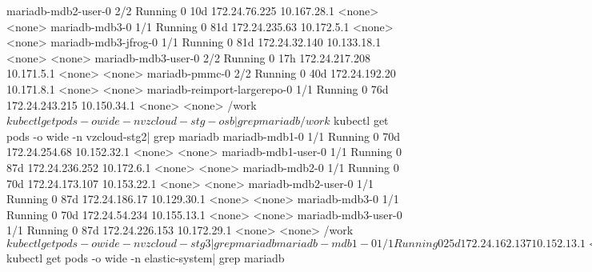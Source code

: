mariadb-mdb2-user-0                                   2/2     Running       0          10d     172.24.76.225    10.167.28.1   <none>           <none>
mariadb-mdb3-0                                        1/1     Running       0          81d     172.24.235.63    10.172.5.1    <none>           <none>
mariadb-mdb3-jfrog-0                                  1/1     Running       0          81d     172.24.32.140    10.133.18.1   <none>           <none>
mariadb-mdb3-user-0                                   2/2     Running       0          17h     172.24.217.208   10.171.5.1    <none>           <none>
mariadb-pmmc-0                                        2/2     Running       0          40d     172.24.192.20    10.171.8.1    <none>           <none>
mariadb-reimport-largerepo-0                          1/1     Running       0          76d     172.24.243.215   10.150.34.1   <none>           <none>
/work $ kubectl get pods -o wide -n vzcloud-stg-osb | grep mariadb
/work $ kubectl get pods -o wide -n vzcloud-stg2| grep mariadb
mariadb-mdb1-0                                       1/1     Running            0          70d     172.24.254.68    10.152.32.1   <none>           <none>
mariadb-mdb1-user-0                                  1/1     Running            0          87d     172.24.236.252   10.172.6.1    <none>           <none>
mariadb-mdb2-0                                       1/1     Running            0          70d     172.24.173.107   10.153.22.1   <none>           <none>
mariadb-mdb2-user-0                                  1/1     Running            0          87d     172.24.186.17    10.129.30.1   <none>           <none>
mariadb-mdb3-0                                       1/1     Running            0          70d     172.24.54.234    10.155.13.1   <none>           <none>
mariadb-mdb3-user-0                                  1/1     Running            0          87d     172.24.226.153   10.172.29.1   <none>           <none>
/work $ kubectl get pods -o wide -n vzcloud-stg3| grep mariadb
mariadb-mdb1-0                                        1/1     Running            0          25d     172.24.162.137   10.152.13.1   <none>           <none>
mariadb-mdb1-user-0                                   1/1     Running            0          26d     172.24.181.73    10.152.14.1   <none>           <none>
mariadb-mdb2-0                                        1/1     Running            0          25d     172.24.203.34    10.158.25.1   <none>           <none>
mariadb-mdb2-user-0                                   1/1     Running            0          26d     172.24.170.119   10.153.23.1   <none>           <none>
mariadb-mdb3-0                                        1/1     Running            0          25d     172.24.153.143   10.155.12.1   <none>           <none>
mariadb-mdb3-user-0                                   1/1     Running            0          26d     172.24.241.231   10.155.30.1   <none>           <none>
/work $ kubectl get pods -o wide -n elastic-system| grep mariadb



